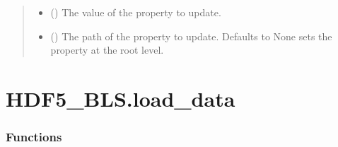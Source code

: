 \documentclass[letterpaper,10pt,english]{sphinxmanual}
\begin{document}
\begin{fulllineitems}
\begin{fulllineitems}
\begin{quote}
\begin{description}
\begin{itemize}
\item {} 
\sphinxAtStartPar
{} () \textendash{} The value of the property to update.

\item {} 
\sphinxAtStartPar
{} () \textendash{} The path of the property to update. Defaults to None sets the property at the root level.

\end{itemize}

\end{description}\end{quote}

\end{fulllineitems}


\end{fulllineitems}


\sphinxstepscope


\section{HDF5\_BLS.load\_data}
\label{\detokenize{source/_autosummary/HDF5_BLS.load_data:module-HDF5_BLS.load_data}}\label{\detokenize{source/_autosummary/HDF5_BLS.load_data:hdf5-bls-load-data}}\label{\detokenize{source/_autosummary/HDF5_BLS.load_data::doc}}\subsubsection*{Functions}
\end{document}
